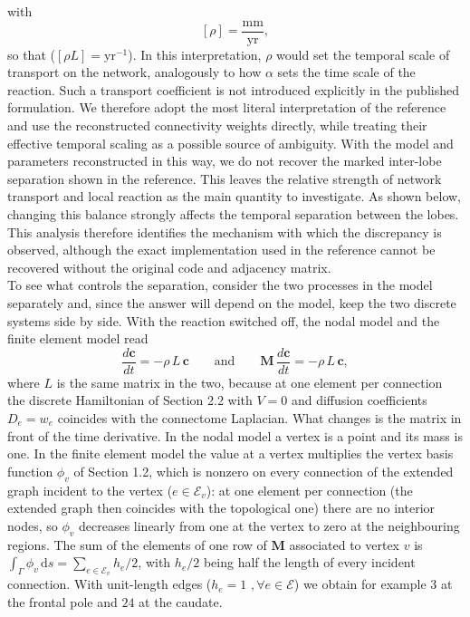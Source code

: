 with
\[
[\rho]=\frac{\mathrm{mm}}{\mathrm{yr}},
\]
so that ($[\rho L]=\mathrm{yr}^{-1}$). In this interpretation, $\rho$ would set the temporal scale of transport on the network, analogously to how $\alpha$ sets the time scale of the reaction. Such a transport coefficient is not introduced explicitly in the published formulation. We therefore adopt the most literal interpretation of the reference and use the reconstructed connectivity weights directly, while treating their effective temporal scaling as a possible source of ambiguity. With the model and parameters reconstructed in this way, we do not recover the marked inter-lobe separation shown in the reference. This leaves the relative strength of network transport and local reaction as the main quantity to investigate. As shown below, changing this balance strongly affects the temporal separation between the lobes. This analysis therefore identifies the mechanism with which the discrepancy is observed, although the exact implementation used in the reference cannot be recovered without the original code and adjacency matrix.\\
To see what controls the separation, consider the two processes in the model separately and, since the answer will depend on the model, keep the two discrete systems side by side. With the reaction switched off, the nodal model and the finite element model read
\[
\frac{d\mathbf{c}}{dt} = -\rho\,L\,\mathbf{c}
\qquad\text{and}\qquad
\mathbf{M}\,\frac{d\mathbf{c}}{dt} = -\rho\,L\,\mathbf{c},
\]
where $L$ is the same matrix in the two, because at one element per connection the discrete Hamiltonian of Section 2.2 with $V = 0$ and diffusion coefficients $D_e = w_e$ coincides with the connectome Laplacian. What changes is the matrix in front of the time derivative. In the nodal model a vertex is a point and its mass is one. In the finite element model the value at a vertex multiplies the vertex basis function $\phi_v$ of Section 1.2, which is nonzero on every connection of the extended graph incident to the vertex ($e \in \mathcal{E}_v$): at one element per connection (the extended graph then coincides with the topological one) there are no interior nodes, so $\phi_v$ decreases linearly from one at the vertex to zero at the neighbouring regions. The sum of the elements of one row of $\mathbf{M}$ associated to vertex $v$ is $\int_\Gamma \phi_v\,\mathrm{d}s = \sum_{e\in \mathcal{E}_v} h_e/2$, with $h_e/2$ being half the length of every incident connection. With unit-length edges ($h_e = 1\,\,, \forall e \in \mathcal{E}$) we obtain for example $3$ at the frontal pole and $24$ at the caudate.\\
